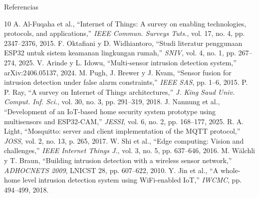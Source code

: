 \documentclass[aspectratio=169,10pt]{beamer}
\begin{document}
\begin{frame}{Referencias}
  \scriptsize
  \begin{thebibliography}{10}
   A. Al-Fuqaha et al., ``Internet of Things: A survey on enabling technologies, protocols, and applications,'' \emph{IEEE Commun. Surveys Tuts.}, vol. 17, no. 4, pp. 2347--2376, 2015.
   F. Oktafiani y D. Widhiantoro, ``Studi literatur penggunaan ESP32 untuk sistem keamanan lingkungan rumah,'' \emph{SNIV}, vol. 4, no. 1, pp. 267--274, 2025.
   V. Arinde y L. Idowu, ``Multi-sensor intrusion detection system,'' arXiv:2406.05137, 2024.
   M. Pugh, J. Brewer y J. Kvam, ``Sensor fusion for intrusion detection under false alarm constraints,'' \emph{IEEE SAS}, pp. 1--6, 2015.
   P. P. Ray, ``A survey on Internet of Things architectures,'' \emph{J. King Saud Univ. Comput. Inf. Sci.}, vol. 30, no. 3, pp. 291--319, 2018.
   J. Nannung et al., ``Development of an IoT-based home security system prototype using multisensors and ESP32-CAM,'' \emph{JESSI}, vol. 6, no. 2, pp. 168--177, 2025.
   R. A. Light, ``Mosquitto: server and client implementation of the MQTT protocol,'' \emph{JOSS}, vol. 2, no. 13, p. 265, 2017.
   W. Shi et al., ``Edge computing: Vision and challenges,'' \emph{IEEE Internet Things J.}, vol. 3, no. 5, pp. 637--646, 2016.
   M. Wälchli y T. Braun, ``Building intrusion detection with a wireless sensor network,'' \emph{ADHOCNETS 2009}, LNICST 28, pp. 607--622, 2010.
   Y. Jin et al., ``A whole-home level intrusion detection system using WiFi-enabled IoT,'' \emph{IWCMC}, pp. 494--499, 2018.
  \end{thebibliography}
\end{frame}
\end{document}
